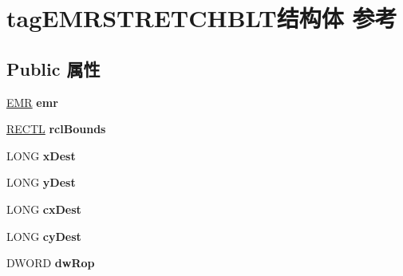 \hypertarget{structtag_e_m_r_s_t_r_e_t_c_h_b_l_t}{}\section{tag\+E\+M\+R\+S\+T\+R\+E\+T\+C\+H\+B\+L\+T结构体 参考}
\label{structtag_e_m_r_s_t_r_e_t_c_h_b_l_t}
\subsection*{Public 属性}
\begin{DoxyCompactItemize}
\item 
\mbox{\label{structtag_e_m_r_s_t_r_e_t_c_h_b_l_t_ade3960e224f25020767181a359743132}} 
\hyperlink{structtag_e_m_r}{E\+MR} {\bfseries emr}
\item 
\mbox{\label{structtag_e_m_r_s_t_r_e_t_c_h_b_l_t_a97df62440d46d9f2cce4b6e5e23e4370}} 
\hyperlink{struct___r_e_c_t_l}{R\+E\+C\+TL} {\bfseries rcl\+Bounds}
\item 
\mbox{\label{structtag_e_m_r_s_t_r_e_t_c_h_b_l_t_a7056edddf49ab336b55ac091ef8be597}} 
L\+O\+NG {\bfseries x\+Dest}
\item 
\mbox{\label{structtag_e_m_r_s_t_r_e_t_c_h_b_l_t_a20a75b24669899074078613e9194f7d3}} 
L\+O\+NG {\bfseries y\+Dest}
\item 
\mbox{\label{structtag_e_m_r_s_t_r_e_t_c_h_b_l_t_a4c71d7eef8798e38a8e521c5a5513c9d}} 
L\+O\+NG {\bfseries cx\+Dest}
\item 
\mbox{\label{structtag_e_m_r_s_t_r_e_t_c_h_b_l_t_ade85bfee52b95c45ac5334df5a14119b}} 
L\+O\+NG {\bfseries cy\+Dest}
\item 
\mbox{\label{structtag_e_m_r_s_t_r_e_t_c_h_b_l_t_ac53b1d90dc28bd8f8afc2e34893827fc}} 
D\+W\+O\+RD {\bfseries dw\+Rop}
\item 
\mbox{\label{structtag_e_m_r_s_t_r_e_t_c_h_b_l_t_a6b2fb9cb19e2c6208d6c4fd9f4419cac}} 

\end{DoxyCompactItemize}
